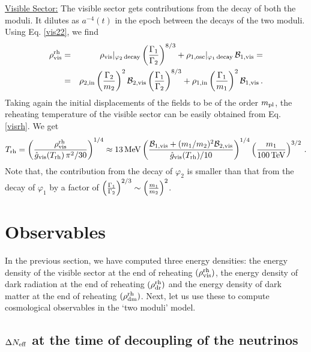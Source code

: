\documentclass[12pt]{article}
\numberwithin{equation}{section}
\def\bea{\begin{eqnarray}}
\def\eea{\end{eqnarray}}
\def\MeV{{\, \rm MeV}}
\def\TeV{{\, \rm TeV}}
\begin{document}
\noindent \underline{Visible Sector:} The visible sector gets contributions from the decay of both the moduli. It dilutes as $a^{-4}(t)$ in the epoch between the 
decays of the two moduli. Using Eq. \eqref{vis22}, we find
%
 \bea
\rho_{\rm vis}^{\rm rh} &=&  \rho_{\rm vis}|_ {\rm \varphi_2 \, decay} \left( \frac{\Gamma_1}{\Gamma_2} \right)^{8/3} +
\rho_{\rm 1,osc}|_ {\rm \varphi_1 \, decay}  \, {\cal B}_{\rm 1,vis} = \\
&=& \rho_{\rm 2, in} \left( \frac{\Gamma_2}{m_2} \right)^2  {\cal B}_{\rm 2,vis}    \left( \frac{\Gamma_1}{\Gamma_2} \right)^{8/3} +
\rho_{\rm 1, in}  \left( \frac{\Gamma_1}{m_1} \right)^2  {\cal B}_{\rm 1,vis}  \,.
 \label{visrh}
\eea
%
Taking again the initial displacements of the fields to be of the order $m_{\rm pl}$,  the reheating temperature of the visible sector can be
easily obtained from Eq. \eqref{visrh}. We get
% 
\bea
\label{vt}
T_{\rm rh} =  \left( \frac{\rho_{\rm vis}^{\rm rh} }{\hat{g}_{\rm vis}(T_{\rm rh} ) \, \pi^2/30} \right)^{1/4} \approx 13 \MeV 
\left( \frac{{\cal B}_{\rm 1,vis}+ (m_1/m_2)^2 {\cal B}_{\rm 2,vis}}{\hat{g}_{\rm vis}(T_{\rm rh})/10}  \right)^{1/4} \left(\frac{m_1}{100 \TeV}\right)^{3/2} \,.
\eea
%
Note that, the contribution from the decay of $\varphi_2$ is smaller than that from the decay of $\varphi_1$ by a factor of
$\left( \frac{\Gamma_1}{\Gamma_2} \right)^{2/3} \sim \left ({ m_1 \over m_2} \right)^2$. 

\section{Observables}

In the previous section, we have computed three energy densities: the energy density of the visible sector at the end of reheating $(\rho^{\rm rh}_{\rm vis})$,
the energy density of dark radiation at the end of reheating $(\rho^{\rm rh}_{\rm dr})$ and the energy density of dark matter at the end of reheating
$(\rho^{\rm rh}_{\rm dm})$. Next, let us use these to compute cosmological observables in the `two moduli' model.

  
%
\subsection{$\Delta N_{\rm eff}$ at the time of decoupling of the neutrinos} 
\label{droo}
\end{document}
